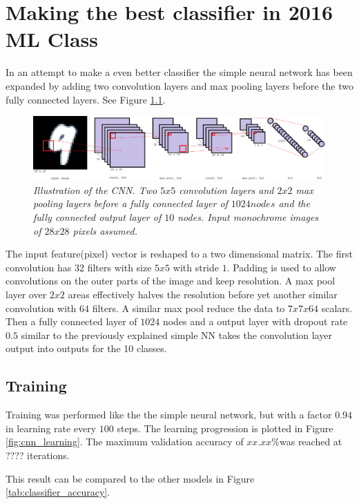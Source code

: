 \documentclass[a4paper,10pt,article,oneside,english]{memoir}
\let\oldcaption\caption
\renewcommand{\caption}[1]{\oldcaption{\emph{#1}}}
\begin{document}
	
	
	
	\chapter{Making the best classifier in 2016 ML Class}
	In an attempt to make a even better classifier the simple neural network has been expanded by adding two convolution layers and max pooling layers before the two fully connected layers. See Figure \ref{fig:cnn_layout}.
	
	\begin{figure}[h!]
		\centering
		\includegraphics[width=0.9\linewidth]{cnn_layout.png}
		\caption{Illustration of the CNN. Two $5 x 5$ convolution layers and $2 x 2$ max pooling layers before a fully connected layer of $1024 nodes$ and the fully connected output layer of $10$ nodes. Input monochrome images of $28x28$ pixels assumed.}
		\label{fig:cnn_layout}
	\end{figure}
	
	The input feature(pixel) vector is reshaped to a two dimensional matrix. The first convolution has $32$ filters with size $5x5$ with stride $1$. Padding is used to allow convolutions on the outer parts of the image and keep resolution. A max pool layer over $2x2$ areas effectively halves the resolution before yet another similar convolution with $64$ filters. A similar max pool reduce the data to $7x7x64$ scalars. Then a fully connected layer of $1024$ nodes and a output layer with dropout rate $0.5$ similar to the previously explained simple NN takes the convolution layer output into outputs for the 10 classes. 
	
	
	
	
	\section{Training}
	Training was performed like the the simple neural network, but with a factor $0.94$ in learning rate every $100$ steps. The learning progression is plotted in Figure \ref{fig:cnn_learning}. 
	The maximum validation accuracy of $xx.xx\%$was reached at ???? iterations. 
	
	
	
	This result can be compared to the other models in Figure \ref{tab:classifier_accuracy}. 
	
\end{document}
